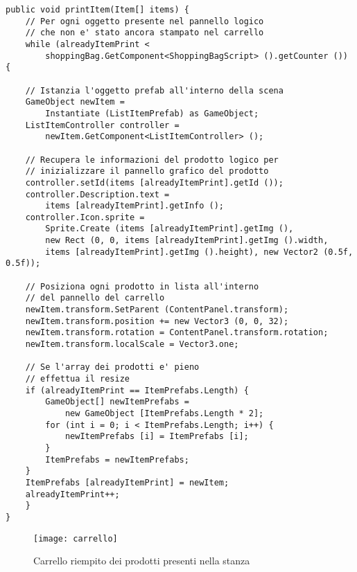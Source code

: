 \begin{lstlisting}[style=MyCStyle]
public void printItem(Item[] items) {
	// Per ogni oggetto presente nel pannello logico
	// che non e' stato ancora stampato nel carrello
	while (alreadyItemPrint < 
		shoppingBag.GetComponent<ShoppingBagScript> ().getCounter ()) {

	// Istanzia l'oggetto prefab all'interno della scena
	GameObject newItem = 
		Instantiate (ListItemPrefab) as GameObject;
	ListItemController controller = 
		newItem.GetComponent<ListItemController> ();

	// Recupera le informazioni del prodotto logico per 
	// inizializzare il pannello grafico del prodotto
	controller.setId(items [alreadyItemPrint].getId ());
	controller.Description.text = 
		items [alreadyItemPrint].getInfo ();
	controller.Icon.sprite = 
		Sprite.Create (items [alreadyItemPrint].getImg (), 
		new Rect (0, 0, items [alreadyItemPrint].getImg ().width, 
		items [alreadyItemPrint].getImg ().height), new Vector2 (0.5f, 0.5f));

	// Posiziona ogni prodotto in lista all'interno
	// del pannello del carrello
	newItem.transform.SetParent (ContentPanel.transform);
	newItem.transform.position += new Vector3 (0, 0, 32);
	newItem.transform.rotation = ContentPanel.transform.rotation;
	newItem.transform.localScale = Vector3.one;

	// Se l'array dei prodotti e' pieno
	// effettua il resize
	if (alreadyItemPrint == ItemPrefabs.Length) {
		GameObject[] newItemPrefabs = 
			new GameObject [ItemPrefabs.Length * 2];
		for (int i = 0; i < ItemPrefabs.Length; i++) {
			newItemPrefabs [i] = ItemPrefabs [i];
		}
		ItemPrefabs = newItemPrefabs;
	}
	ItemPrefabs [alreadyItemPrint] = newItem;
	alreadyItemPrint++;
	}
}
\end{lstlisting}

\label{Carrello}
\begin{figure}[ht]
	\begin{center}
		\texttt{[image: carrello]}
		\caption{Carrello riempito dei prodotti presenti nella stanza}
	\end{center}
\end{figure}
\FloatBarrier 